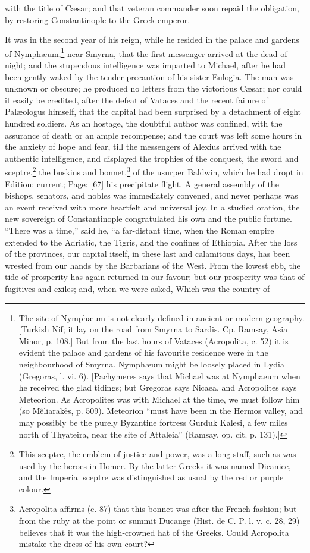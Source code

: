 with the title of Cæsar; and that veteran commander soon repaid the obligation, by restoring Constantinople to the Greek emperor.

It was in the second year of his reign, while he resided in the palace and gardens of Nymphæum,\footnote{The site of Nymphæum is not clearly defined in ancient or modern geography. [Turkish Nif; it lay on the road from Smyrna to Sardis. Cp. Ramsay, Asia Minor, p. 108.] But from the last hours of Vataces (Acropolita, c. 52) it is evident the palace and gardens of his favourite residence were in the neighbourhood of Smyrna. Nymphæum might be loosely placed in Lydia (Gregoras, l. vi. 6). [Pachymeres says that Michael was at Nymphaeum when he received the glad tidings; but Gregoras says Nicaea, and Acropolites says Meteorion. As Acropolites was with Michael at the time, we must follow him (so Mêliarakês, p. 509). Meteorion \texthebrew{“}must have been in the Hermos valley, and may possibly be the purely Byzantine fortress Gurduk Kalesi, a few miles north of Thyateira, near the site of Attaleia\texthebrew{}” (Ramsay, op. cit. p. 131).]} near Smyrna, that the first messenger arrived at the dead of night; and the stupendous intelligence was imparted to Michael, after he had been gently waked by the tender precaution of his sister Eulogia. The man was unknown or obscure; he produced no letters from the victorious Cæsar; nor could it easily be credited, after the defeat of Vataces and the recent failure of Palæologus himself, that the capital had been surprised by a detachment of eight hundred soldiers. As an hostage, the doubtful author was confined, with the assurance of death or an ample recompense; and the court was left some hours in the anxiety of hope and fear, till the messengers of Alexius arrived with the authentic intelligence, and displayed the trophies of the conquest, the sword and sceptre,\footnote{This sceptre, the emblem of justice and power, was a long staff, such as was used by the heroes in Homer. By the latter Greeks it was named Dicanice, and the Imperial sceptre was distinguished as usual by the red or purple colour.} the buskins and bonnet,\footnote{Acropolita affirms (c. 87) that this bonnet was after the French fashion; but from the ruby at the point or summit Ducange (Hist. de C. P. l. v. c. 28, 29) believes that it was the high-crowned hat of the Greeks. Could Acropolita mistake the dress of his own court?} of the usurper Baldwin, which he had dropt in Edition: current; Page: [67] his precipitate flight. A general assembly of the bishops, senators, and nobles was immediately convened, and never perhaps was an event received with more heartfelt and universal joy. In a studied oration, the new sovereign of Constantinople congratulated his own and the public fortune. \texthebrew{“}There was a time,\texthebrew{}” said he, \texthebrew{“}a far-distant time, when the Roman empire extended to the Adriatic, the Tigris, and the confines of Ethiopia. After the loss of the provinces, our capital itself, in these last and calamitous days, has been wrested from our hands by the Barbarians of the West. From the lowest ebb, the tide of prosperity has again returned in our favour; but our prosperity was that of fugitives and exiles; and, when we were asked, Which was the country of 